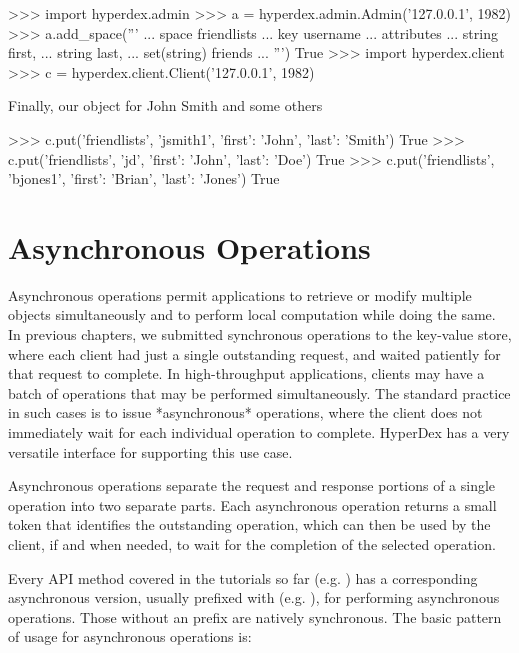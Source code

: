 \begin{pythoncode}
>>> import hyperdex.admin
>>> a = hyperdex.admin.Admin('127.0.0.1', 1982)
>>> a.add_space('''
... space friendlists
... key username
... attributes
...    string first,
...    string last,
...    set(string) friends
... ''')
True
>>> import hyperdex.client
>>> c = hyperdex.client.Client('127.0.0.1', 1982)
\end{pythoncode}

Finally, our object for John Smith and some others

\begin{pythoncode}
>>> c.put('friendlists', 'jsmith1', {'first': 'John', 'last': 'Smith'})
True
>>> c.put('friendlists', 'jd', {'first': 'John', 'last': 'Doe'})
True
>>> c.put('friendlists', 'bjones1', {'first': 'Brian', 'last': 'Jones'})
True
\end{pythoncode}

\section{Asynchronous Operations}
\label{sec:async-ops:ops}

Asynchronous operations permit applications to retrieve or modify multiple
objects simultaneously and to perform local computation while doing the same.
In previous chapters, we submitted synchronous operations to the key-value
store, where each client had just a single outstanding request, and waited
patiently for that request to complete.  In high-throughput applications,
clients may have a batch of operations that may be performed simultaneously.
The standard practice in such cases is to issue *asynchronous* operations, where
the client does not immediately wait for each individual operation to complete.
HyperDex has a very versatile interface for supporting this use case.

Asynchronous operations separate the request and response portions of a single
operation into two separate parts.  Each asynchronous operation returns a small
token that identifies the outstanding operation, which can then be used by the
client, if and when needed, to wait for the completion of the selected
operation.

Every API method covered in the tutorials so far (e.g. ) has a
corresponding asynchronous version, usually prefixed with  (e.g.
), for performing asynchronous operations.  Those without an
 prefix are natively synchronous.  The basic pattern of usage for
asynchronous operations is:

